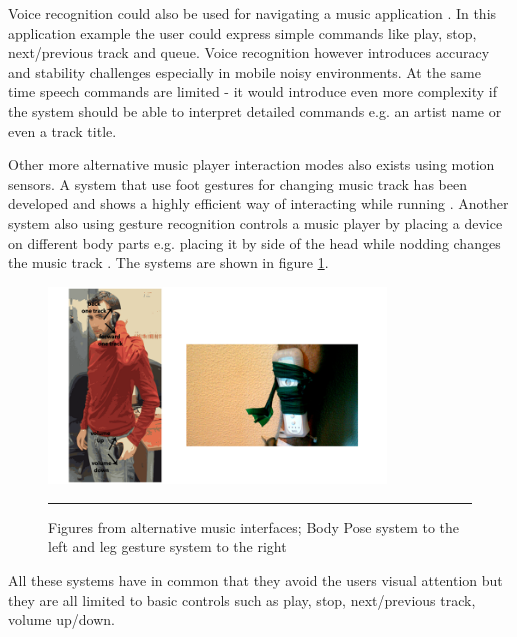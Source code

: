 Voice recognition could also be used for navigating a music application \cite{stewart_boling_voice_2013}. In this application example the user could express simple commands like play, stop, next/previous track and queue. Voice recognition however introduces accuracy and stability challenges especially in mobile noisy environments. At the same time speech commands are limited - it would introduce even more complexity if the system should be able to interpret detailed commands e.g. an artist name or even a track title.


Other more alternative music player interaction modes also exists using motion sensors. A system that use foot gestures for changing music track has been developed and shows a highly efficient way of interacting while running \cite{smus_running_2010}. Another system also using gesture recognition controls a music player by placing a device on different body parts e.g. placing it by side of the head while nodding changes the music track \cite{strachan_bodyspace_2007}. The systems are shown in figure \ref{fig:bodyandleg}.

\begin{figure}[htbp]
	\centering
		\includegraphics[width=0.8\textwidth,height=\textheight,keepaspectratio]{./Figures/bodyposeandleg.png}
		\rule{35em}{0.5pt}
	\caption[Alternative music players]{Figures from alternative music interfaces; Body Pose system \cite{strachan_bodyspace_2007} to the left and leg gesture system \cite{smus_running_2010} to the right}
	\label{fig:bodyandleg}
\end{figure}

All these systems have in common that they avoid the users visual attention but they are all limited to basic controls such as play, stop, next/previous track, volume up/down.

